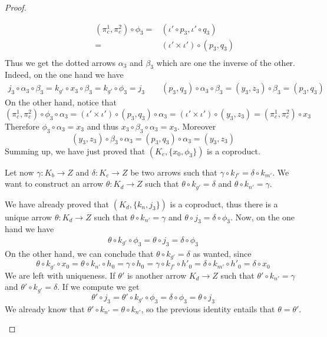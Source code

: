 \documentclass[3p]{elsarticle}
\theoremstyle{remark}
\theoremstyle{definition}
\begin{document}
\begin{proof}
\begin{enumerate}
\[\begin{split}
 \end{split}\qquad \begin{split}
 (\pi^1_c, \pi^2_c)\circ \phi_3=&(\iota'\circ p_3, \iota' \circ q_3)\\=&
(\iota'\times \iota')\circ (p_3, q_3)\\& \end{split}\] 
Thus we get the dotted arrows $\alpha_3$ and $\beta_3$ which are one the inverse of the other. Indeed, on the one hand we have
\begin{align*}
j_3\circ \alpha_3\circ \beta_3=k_{g'}\circ x_3\circ \beta_3=k_{g'} \circ \phi_3=j_3  \qquad 
(p_3, q_3)\circ \alpha_3\circ \beta_3=(y_3, z_3)\circ \beta_3=(p_3, q_3) 
\end{align*}
 On the other hand, notice that
 \[(\pi^1_c, \pi^2_c)\circ \phi_3\circ \alpha_3 =(\iota'\times \iota')\circ (p_3, q_3)\circ \alpha_3= (\iota'\times \iota')\circ (y_3, z_3)=(\pi^1_c, \pi^2_c)\circ x_3\]
 Therefore $\phi_3\circ \alpha_3=x_3$ and thus $x_3\circ \beta_3\circ \alpha_3=x_3$. Moreover
 \[(y_3, z_3)\circ \beta_3\circ \alpha_3=(p_3, q_3)\circ \alpha_3=(y_3, z_3)\]
 Summing up, we have just proved that $(K_c, \{x_0, \phi_3\})$ is a coproduct.
 
 Let now $\gamma\colon K_b\to Z$ and $\delta\colon K_c\to Z$ be two arrows such that $\gamma\circ k_{f'}=\delta\circ k_{m'}$. We want to construct an arrow $\theta\colon K_d\to Z$ such that $\theta\circ k_{g'}=\delta$ and $\theta\circ k_{n'}=\gamma$.	
 
 We have already proved that $(K_d, \{k_n, j_3\})$ is a coproduct, thus there is a unique arrow $\theta\colon K_d\to Z$ such that  $\theta \circ k_{n'}=\gamma$ and $\theta \circ j_3=\delta \circ \phi_3 $.
 Now, on the one hand we have
 \begin{align*}
 	\theta \circ k_{g'}\circ \phi_3=\theta \circ  j_3=\delta\circ \phi_3 
 \end{align*}
 On the other hand, we can conclude that $\theta \circ k_{g'}=\delta$ as wanted, since
 \[\theta \circ k_{g'}\circ x_0=\theta \circ k_{n'}\circ h_0=\gamma \circ h_0=\gamma \circ k_{f'}\circ h'_0=\delta \circ k_{m'}\circ h'_0=\delta \circ x_0 \]
 We are left with uniqueness. If $\theta'$ is another arrow $K_d\to Z$ such that $\theta'\circ k_{n'}=\gamma$ and $\theta'\circ k_{g'}= \delta$. If we compute we get
 \[\theta'\circ j_3=\theta'\circ k_{g'}\circ \phi_3=\delta \circ \phi_3=\theta \circ j_3 \]
 We already know that $\theta'\circ k_{n'}=\theta \circ k_{n'}$, so the previous identity entails that $\theta =\theta'$.
			 \qedhere 
	\end{enumerate}
\end{proof}
\end{document}
